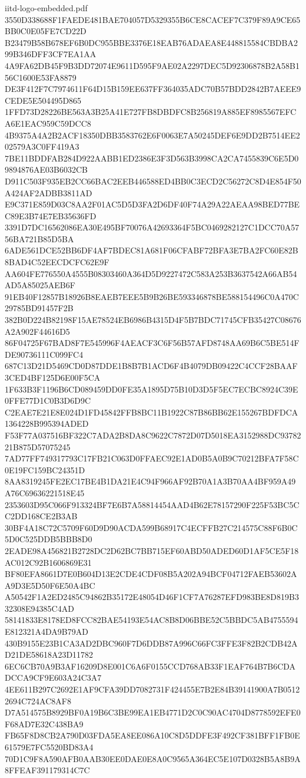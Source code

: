 \begin{filecontents*}[overwrite]{iitd-logo-embedded.pdf}
3550D338688F1FAEDE481BAE704057D5329355B6CE8CACEF7C379F89A9CE65BB0C0E05FE7CD22D
B23479B58B678EF6B0DC955BBE3376E18EAB76ADAEA8E448815584CBDBA299B346DFF3CF7EA1AA
4A9FA62DB45F9B3DD72074E9611D595F9AE02A2297DEC5D92306878B2A58B156C1600E53FA8879
DE3F412F7C7974611F64D15B159EE637FF364035ADC70B57BDD2842B7AEEE9CEDE5E504495D865
1FFD73D28226BE563A3B25A41E727FB8DBDFC8B256819A885EF8985567EFCA6E1EAC959C59DCC8
4B9375A4A2B2ACF18350DBB3583762E6F0063E7A50245DEF6E9DD2B7514EE202579A3C0FF419A3
7BE11BDDFAB284D922AABB1ED2386E3F3D563B3998CA2CA7455839C6E5D09894876AE03B6032CB
D911C503F935EB2CC66BAC2EEB446588ED4BB0C3ECD2C56272C8D4E854F50A424AF2ADBB3811AD
E9C371E859D03C8AA2F01AC5D5D3FA2D6DF40F74A29A22AEAA98BED77BEC89E3B74E7EB35636FD
3391D7DC16562086EA30E495BF70076A42693364F5BC0469282127C1DCC70A5756BA721B85D5BA
6ADE561DCE52BB6DF4AF7BDEC81A681F06CFABF72BFA3E7BA2FC60E82B8BAD4C52EECDCFC62E9F
AA604FE776550A4555B08303460A364D5D9227472C583A253B3637542A66AB54AD5A85025AEB6F
91EB40F12857B18926B8EAEB7EEE5B9B26BE593346878BE588154496C0A470C29785BD91457F2B
382B0D224B82198F15AE78524EB6986B4315D4F5B7BDC71745CFB35427C08676A2A902F44616D5
86F04725F67BAD8F7E545996F4AEACF3C6F56B57AFD8748AA69B6C5BE514FDE90736111C099FC4
687C13D21D5469CD0D87DDE1B8B7B1ACD6F4B4079DB09422C4CCF28BAAF3CED4BF125D6E00F5CA
1F633B3F1196B6CD089459DD0FE35A1895D75B10D3D5F5EC7ECBC8924C39E0FFE77D1C0B3D6D9C
C2EAE7E21E8E024D1FD45842FFB8BC11B1922C87B86BB62E155267BDFDCA1364228B995394ADED
F53F77A037516BF322C7ADA2B8DA8C9622C7872D07D5018EA3152988DC9378221B875D57075245
7AD77FF749317793C17FB21C063D0FFAEC92E1AD0B5A0B9C70212BFA7F58C0E19FC159BC24351D
8AA8319245FE2EC17BE4B1DA21E4C94F966AF92B70A1A3B70AA4BF959A49A76C69636221518E45
2353603D95C066F913324BF7E6B7A58814454AAD4B62E78157290F225F53BC5CC2DD168CE2B3AB
30BF4A18C72C5709F60D9D90ACDA599B68917C4ECFFB27C214575C88F6B0C5D0C525DDB5BBB8D0
2EADE98A456821B2728DC2D62BC7BB715EF60ABD50ADED60D1AF5CE5F18AC012C92B1606869E31
BF80EFA8661D7E0B604D13E2CDE4CDF08B5A202A94BCF04712FAEB53602AA9D3E5D50F6E50A4BC
A50542F1A2ED2485C94862B35172E48054D46F1CF7A76287EFD983BE8D819B332308E94385C4AD
58141833E8178ED8FCC82BAE54193E54AC8B8D06BBE52C5BBDC5AB4755594E812321A4DA9B79AD
430B9155E23B1CA3AD2DBC960F7D6DDB87A996C66FC3FFE3F82B2CDB42AD21DE58618A23D11782
6EC6CB70A9B3AF16209D8E001C6A6F0155CCD768AB33F1EAF764B7B6CDADCCA9CF9E603A24C3A7
4EE611B297C2692E1AF9CFA39DD7082731F424455E7B2E84B39141900A7B05122694C724AC8AF8
D7A514575B8929BF0A19B6C3BE99EA1EB4771D2C0C90AC4704D8778592EFE0F68AD7E32C438BA9
FB65F8D8CB2A790D03FDA5EA8EE086A10C8D5DDFE3F492CF381BFF1FB0E61579E7FC5520BD83A4
70D1C9F8A590AFB0AAB30EE0DAE0E8A0C9565A364EC5E107D0328B5A8B9A8FFEAF391179314C7C

\end{filecontents*}
